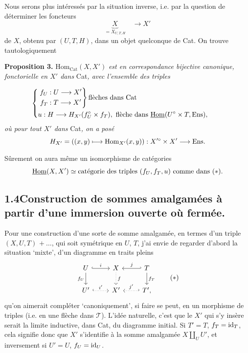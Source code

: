 
Nous serons plus intéressés par la situation inverse, i.e. par la question de déterminer les foncteurs
\[
\underbrace{X}_{= X_{U,T,H}} \quad \longrightarrow X'
\]
de $X$, obtenu par $(U,T,H)$, dans un objet quelconque de Cat. On trouve tautologiquement

\textbf{Proposition 3.} $\mathrm{Hom}_{\mathrm{Cat}}(X,X')$ \textit{est en correspondance bijective canonique, fonctorielle en $X'$ dans} Cat\textit{, avec l'ensemble des triples}


\[
\left\{
\begin{aligned}
&\left.\begin{aligned} f_U &: U \longrightarrow X' \\ f_T &: T \longrightarrow X' \end{aligned}\right\}\text{flèches dans Cat}\\
&u : H \longrightarrow H_{X'}(f_U^{\circ}\times f_T),\ \text{flèche dans } \underline{\mathrm{Hom}}(U^{\circ}\times T,\mathrm{Ens}),
\end{aligned}
\right.
\tag*{}
\]
\textit{où pour tout $X'$ dans} Cat\textit{, on a posé}
\[
H_{X'} = ((x,y)\longmapsto \mathrm{Hom}_{X'}(x,y)) : X'^{\circ}\times X' \longrightarrow \mathrm{Ens}.
\]

Sûrement on aura même un isomorphisme de catégories
\[
\underline{\mathrm{Hom}}(X,X') \simeq \text{catégorie des triples } (f_U,f_T,u) \text{ comme dans } (*).
\]

\subsection*{1.4\quad Construction de sommes amalgamées à partir d'une immersion ouverte où fermée.} %

Pour une construction d'une sorte de somme amalgamée, en termes d'un triple $(X,U,T)$ $+\ \ldots$,  qui soit symétrique en $U$, $T$, j'ai envie de regarder d'abord la situation ‘mixte’, d'un diagramme en traits pleins
\[
\begin{tikzcd}
U \arrow[r, hook, "i"] \arrow[d, "f_U"'] & X \arrow[d, dotted, "f"] & T \arrow[l, hook', "j"'] \arrow[d, "f_T"] \\
U' \arrow[r, hook, dotted, "i'"] & X' & T', \arrow[l, hook', dotted, "j'"']
\end{tikzcd}
\tag*{$(*)$}
\]
qu'on aimerait compléter ‘canoniquement’, si faire se peut, en un morphisme de triples (i.e. en une flèche dans $\mathcal{T}$). L'idée naturelle, c'est que le $X'$ qui s'y insère serait la limite inductive, dans Cat, du diagramme initial. Si $T'=T$, $f_T=\mathrm{id}_T$, cela signifie donc que $X'$ s'identifie à la somme amalgamée $X\amalg_U U'$, et inversement si $U'=U$, $f_U=\mathrm{id}_U$.

